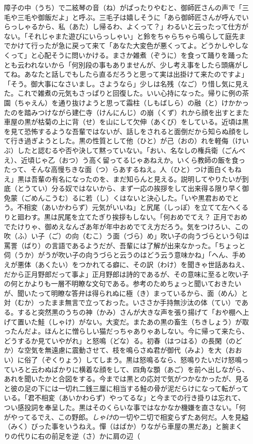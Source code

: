 \documentclass{book}
\begin{document}
障子の中（うち）で二絃琴の音（ね）がぱったりやむと、御師匠さんの声で「三毛や三毛や御飯だよ」と呼ぶ。三毛子は嬉しそうに「あら御師匠さんが呼んでいらっしゃるから、私（あた）し帰るわ、よくって？」わるいと云ったって仕方がない。「それじゃまた遊びにいらっしゃい」と鈴をちゃらちゃら鳴らして庭先までかけて行ったが急に戻って来て「あなた大変色が悪くってよ。どうかしやしなくって」と心配そうに問いかける。まさか雑煮（ぞうに）を食って踊りを踊ったとも云われないから「何別段の事もありませんが、少し考え事をしたら頭痛がしてね。あなたと話しでもしたら直るだろうと思って実は出掛けて来たのですよ」「そう。御大事になさいまし。さようなら」少しは名残（なご）り惜し気に見えた。これで雑煮の元気もさっぱりと回復した。いい心持になった。帰りに例の茶園（ちゃえん）を通り抜けようと思って霜柱（しもばしら）の融（と）けかかったのを踏みつけながら建仁寺（けんにんじ）の崩（くず）れから顔を出すとまた車屋の黒が枯菊の上に背（せ）を山にして欠伸（あくび）をしている。近頃は黒を見て恐怖するような吾輩ではないが、話しをされると面倒だから知らぬ顔をして行き過ぎようとした。黒の性質として他（ひと）が己（おの）れを軽侮（けいぶ）したと認むるや否や決して黙っていない。「おい、名なしの権兵衛（ごんべえ）、近頃じゃ乙（おつ）う高く留ってるじゃあねえか。いくら教師の飯を食ったって、そんな高慢ちきな面（つ）らあするねえ。人（ひと）つけ面白くもねえ」黒は吾輩の有名になったのを、まだ知らんと見える。説明してやりたいが到底（とうてい）分る奴ではないから、まず一応の挨拶をして出来得る限り早く御免蒙（ごめんこうむ）るに若（し）くはないと決心した。「いや黒君おめでとう。不相変（あいかわらず）元気がいいね」と尻尾（しっぽ）を立てて左へくるりと廻わす。黒は尻尾を立てたぎり挨拶もしない。「何おめでてえ？ 正月でおめでたけりゃ、御めえなんざあ年が年中おめでてえ方だろう。気をつけろい、この吹（ふ）い子（ご）の向（むこ）う面（づら）め」吹い子の向うづらという句は罵詈（ばり）の言語であるようだが、吾輩には了解が出来なかった。「ちょっと伺（うか）がうが吹い子の向うづらと云うのはどう云う意味かね」「へん、手めえが悪体（あくたい）をつかれてる癖に、その訳（わけ）を聞きゃ世話あねえ、だから正月野郎だって事よ」正月野郎は詩的であるが、その意味に至ると吹い子の何とかよりも一層不明瞭な文句である。参考のためちょっと聞いておきたいが、聞いたって明瞭な答弁は得られぬに極（き）まっているから、面（めん）と対（むか）ったまま無言で立っておった。いささか手持無沙汰の体（てい）である。すると突然黒のうちの神（かみ）さんが大きな声を張り揚げて「おや棚へ上げて置いた鮭（しゃけ）がない。大変だ。またあの黒の畜生（ちきしょう）が取ったんだよ。ほんとに憎らしい猫だっちゃありゃあしない。今に帰って来たら、どうするか見ていやがれ」と怒鳴（どな）る。初春（はつはる）の長閑（のどか）な空気を無遠慮に震動させて、枝を鳴らさぬ君が御代（みよ）を大（おおい）に俗了（ぞくりょう）してしまう。黒は怒鳴るなら、怒鳴りたいだけ怒鳴っていろと云わぬばかりに横着な顔をして、四角な顋（あご）を前へ出しながら、あれを聞いたかと合図をする。今までは黒との応対で気がつかなかったが、見ると彼の足の下には一切れ二銭三厘に相当する鮭の骨が泥だらけになって転がっている。「君不相変（あいかわらず）やってるな」と今までの行き掛りは忘れて、つい感投詞を奉呈した。黒はそのくらいな事ではなかなか機嫌を直さない。「何がやってるでえ、この野郎。\emph{しゃけ}の一切や二切で相変らずたあ何だ。人を見縊（みく）びった事をいうねえ。憚（はばか）りながら車屋の黒だあ」と腕まくりの代りに右の前足を逆（さ）かに肩の辺（
\end{document}
